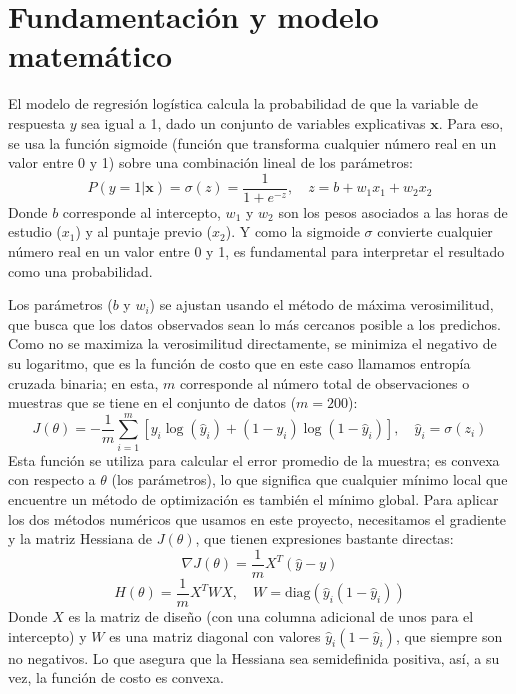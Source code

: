 \section{Fundamentación y modelo matemático}
El modelo de regresión logística calcula la probabilidad de que la variable de respuesta $y$ sea igual a 1, dado un conjunto de variables explicativas $\mathbf{x}$. Para eso, se usa la función sigmoide (función que transforma cualquier número real en un valor entre 0 y 1) sobre una combinación lineal de los parámetros:
\begin{equation}
P(y=1|\mathbf{x}) = \sigma(z) = \frac{1}{1+e^{-z}}, \quad z = b + w_1 x_1 + w_2 x_2
\end{equation}
Donde $b$ corresponde al intercepto, $w_1$ y $w_2$ son los pesos asociados a las horas de estudio ($x_1$) y al puntaje previo ($x_2$). Y como la sigmoide $\sigma$ convierte cualquier número real en un valor entre 0 y 1, es fundamental para interpretar el resultado como una probabilidad.

Los parámetros ($b$ y $w_i$) se ajustan usando el método de máxima verosimilitud, que busca que los datos observados sean lo más cercanos posible a los predichos. Como no se maximiza la verosimilitud directamente, se minimiza el negativo de su logaritmo, que es la función de costo que en este caso llamamos entropía cruzada binaria; en esta, $m$ corresponde al número total de observaciones o muestras que se tiene en el conjunto de datos ($m = 200$):
\begin{equation}
J(\theta) = -\frac{1}{m} \sum_{i=1}^{m} \left[ y_i \log(\hat{y}_i) + (1 - y_i) \log(1 - \hat{y}_i) \right], \quad \hat{y}_i = \sigma(z_i)
\end{equation}
Esta función se utiliza para calcular el error promedio de la muestra; es convexa con respecto a $\theta$ (los parámetros), lo que significa que cualquier mínimo local que encuentre un método de optimización es también el mínimo global. Para aplicar los dos métodos numéricos que usamos en este proyecto, necesitamos el gradiente y la matriz Hessiana de $J(\theta)$, que tienen expresiones bastante directas:
\begin{equation}
\nabla J(\theta) = \frac{1}{m} X^T (\hat{y} - y)
\end{equation}
\begin{equation}
H(\theta) = \frac{1}{m} X^T W X, \quad W = \text{diag}(\hat{y}_i(1 - \hat{y}_i))
\end{equation}
Donde $X$ es la matriz de diseño (con una columna adicional de unos para el intercepto) y $W$ es una matriz diagonal con valores $\hat{y}_i(1 - \hat{y}_i)$, que siempre son no negativos. Lo que asegura que la Hessiana sea semidefinida positiva, así, a su vez, la función de costo es convexa.

